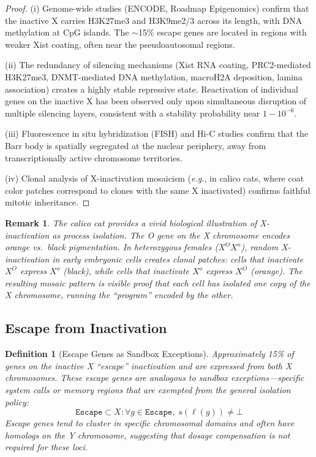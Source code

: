 \documentclass[12pt,a4paper]{article}
\newtheorem{definition}[theorem]{Definition}
\newtheorem{remark}[theorem]{Remark}
\newcommand{\eg}{\textit{e.g.}}
\begin{document}
\begin{proof}
(i) Genome-wide studies (ENCODE, Roadmap Epigenomics) confirm that the inactive X carries H3K27me3 and H3K9me2/3 across its length, with DNA methylation at CpG islands. The $\sim$15\% escape genes are located in regions with weaker Xist coating, often near the pseudoautosomal regions.

(ii) The redundancy of silencing mechanisms (Xist RNA coating, PRC2-mediated H3K27me3, DNMT-mediated DNA methylation, macroH2A deposition, lamina association) creates a highly stable repressive state. Reactivation of individual genes on the inactive X has been observed only upon simultaneous disruption of multiple silencing layers, consistent with a stability probability near $1 - 10^{-6}$.

(iii) Fluorescence in situ hybridization (FISH) and Hi-C studies confirm that the Barr body is spatially segregated at the nuclear periphery, away from transcriptionally active chromosome territories.

(iv) Clonal analysis of X-inactivation mosaicism (\eg, in calico cats, where coat color patches correspond to clones with the same X inactivated) confirms faithful mitotic inheritance.
\end{proof}

\begin{remark}
The calico cat provides a vivid biological illustration of X-inactivation as process isolation. The \emph{O} gene on the X chromosome encodes orange vs.\ black pigmentation. In heterozygous females ($X^O X^o$), random X-inactivation in early embryonic cells creates clonal patches: cells that inactivate $X^O$ express $X^o$ (black), while cells that inactivate $X^o$ express $X^O$ (orange). The resulting mosaic pattern is visible proof that each cell has isolated one copy of the X chromosome, running the ``program'' encoded by the other.
\end{remark}

\subsection{Escape from Inactivation}

\begin{definition}[Escape Genes as Sandbox Exceptions]
\label{def:escape}
Approximately 15\% of genes on the inactive X ``escape'' inactivation and are expressed from both X chromosomes. These escape genes are analogous to \emph{sandbox exceptions}---specific system calls or memory regions that are exempted from the general isolation policy:
\[
    \texttt{Escape} \subset X : \forall g \in \texttt{Escape}, \; s(\ell(g)) \neq \bot
\]
Escape genes tend to cluster in specific chromosomal domains and often have homologs on the Y chromosome, suggesting that dosage compensation is not required for these loci.
\end{definition}
\end{document}
